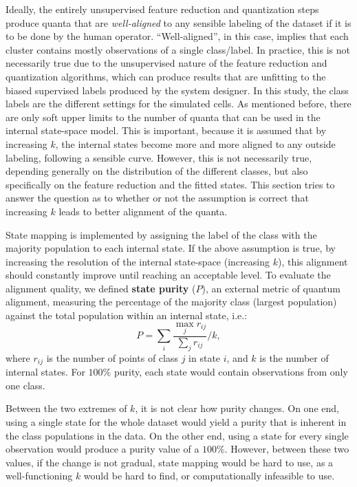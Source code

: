 			Ideally, the entirely unsupervised feature reduction and quantization steps produce quanta that are \textit{well-aligned} to any sensible labeling of the dataset if it is to be done by the human operator.
			``Well-aligned'', in this case, implies that each cluster contains mostly observations of a single class/label.
			In practice, this is not necessarily true due to the unsupervised nature of the feature reduction and quantization algorithms, which can produce results that are unfitting to the biased supervised labels produced by the system designer.
			In this study, the class labels are the different settings for the simulated cells.
			As mentioned before, there are only soft upper limits to the number of quanta that can be used in the internal state-space model.
			This is important, because it is assumed that by increasing $k$, the internal states become more and more aligned to any outside labeling, following a sensible curve.
			However, this is not necessarily true, depending generally on the distribution of the different classes, but also specifically on the feature reduction and the fitted states.
			This section tries to answer the question as to whether or not the assumption is correct that increasing $k$ leads to better alignment of the quanta.
		
			State mapping is implemented by assigning the label of the class with the majority population to each internal state.
			If the above assumption is true, by increasing the resolution of the internal state-space (increasing $k$), this alignment should constantly improve until reaching an acceptable level.
			To evaluate the alignment quality, we defined \textbf{state purity} ($P$), an external metric of quantum alignment, measuring the percentage of the majority class (largest population) against the total population within an internal state, i.e.:
			\begin{equation}\label{eq:purity_single}
			P = \sum_{i} \frac{\max_{j} r_{ij}}{\sum_{j} r_{ij}} / k, 
			\end{equation}
			\noindent where $r_{ij}$ is the number of points of class $j$ in state $i$, and $k$ is the number of internal states.
			For $100\%$ purity, each state would contain observations from only one class.
			
			Between the two extremes of $k$, it is not clear how purity changes.
			On one end, using a single state for the whole dataset would yield a purity that is inherent in the class populations in the data.
			On the other end, using a state for every single observation would produce a purity value of a $100\%$.
			However, between these two values, if the change is not gradual, state mapping would be hard to use, as a well-functioning $k$ would be hard to find, or computationally infeasible to use.
			

